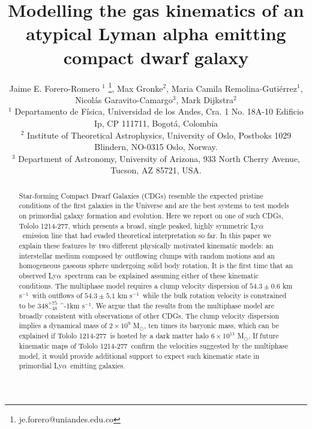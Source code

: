 \documentclass[a4paper,fleqn,usenatbib]{mnras}
\newcommand{\tol}{Tololo 1214-277}
\newcommand{\lya}{\ifmmode{{\rm Ly}\alpha}\else Ly$\alpha$\ \fi}
\newcommand{\kms}{\ifmmode\mathrm{km\ s}^{-1}\else km s$^{-1}$\fi}
\newcommand{\sigmaclump}{$54.3\pm 0.6$ km s$^{-1}$}
\newcommand{\inftyclump}{$54.3\pm 5.1$ km s$^{-1}$}
\begin{document}
\title[An atypical \lya dwarf galaxy]{
Modelling the gas kinematics of an atypical Lyman alpha emitting compact dwarf galaxy}
\author[J.E. Forero-Romero et al.]
{Jaime E. Forero-Romero $^{1}$ \thanks{je.forero@uniandes.edu.co},
Max Gronke$^2$, 
Maria Camila Remolina-Guti\'errez$^1$,
\newauthor
Nicol\'as Garavito-Camargo$^3$, 
Mark Dijkstra$^2$\\
$^1$ Departamento de F\'isica, Universidad de los Andes, Cra. 1
  No. 18A-10 Edificio Ip, CP 111711, Bogot\'a, Colombia \\
$^2$ Institute of Theoretical Astrophysics, University of Oslo,
Postboks 1029 Blindern, NO-0315 Oslo, Norway.\\
$^3$ Department of Astronomy, University of Arizona, 933 North Cherry
Avenue, Tucson, AZ 85721, USA. 
}


\maketitle


\begin{abstract}
	
Star-forming Compact Dwarf Galaxies (CDGs) 
resemble the expected pristine conditions of the first galaxies in the
Universe and are the best systems to test models on primordial galaxy
formation and evolution. 
Here we report on one of such CDGs, \tol, which presents
a broad, single peaked, highly symmetric \lya emission line that had
evaded theoretical interpretation so far.  
In this paper we explain these features by two different physically
motivated kinematic models: 
an interstellar medium composed by outflowing clumps with 
random motions and an homogeneous gaseous sphere undergoing solid body
rotation.
It is the first time that an observed \lya spectrum can be explained
assuming either of these kinematic conditions.
The multiphase model requires a clump velocity dispersion of
\sigmaclump\ with outflows of \inftyclump\, while the
bulk rotation velocity is constrained to be $348^{+75}_{-48}$ \kms.
We argue that the results from the multiphase model are broadly
consistent with observations of other CDGs. 
The clump velocity dispersion implies a dynamical mass of $2\times
10^{9}$ M$_{\odot}$, ten times its baryonic mass, which can be
explained if \tol\ is hosted by a dark matter halo $6\times 10^{11}$
M$_{\odot}$. 
If future kinematic maps of \tol\ confirm the velocities suggested by
the multiphase model, it would provide additional support to expect
such kinematic state in primordial \lya emitting galaxies.   
\end{abstract}
\end{document}

